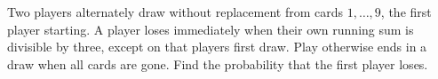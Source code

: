 Two players alternately draw without replacement from cards $1,\ldots,9$, the first player starting. A player loses immediately when their own running sum is divisible by three, except on that player\textquotesingle s first draw. Play otherwise ends in a draw when all cards are gone. Find the probability that the first player loses.
